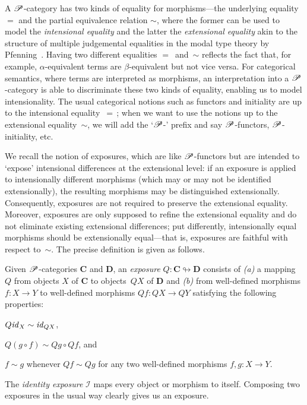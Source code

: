 \documentclass[a4paper,UKenglish,numberwithinsect,cleveref,thm-restate,draft]{lipics-v2021}
\numberwithin{equation}{section}
\theoremstyle{definition}
\theoremstyle{plain}
\begin{document}
A $\mathscr{P}$-category has two kinds of equality for morphisms---the underlying equality $=$ and the partial equivalence relation $\sim$, where the former can be used to model the \emph{intensional equality} and the latter the \emph{extensional equality} akin to the structure of multiple judgemental equalities in the modal type theory by Pfenning~\cite{Pfenning2002a}.
Having two different equalities $=$~and~$\sim$ reflects the fact that, for example, $\alpha$-equivalent terms are $\beta$-equivalent but not vice versa.
For categorical semantics, where terms are interpreted as morphisms, an interpretation into a $\mathscr{P}$-category is able to discriminate these two kinds of equality, enabling us to model intensionality.
The usual categorical notions such as functors and initiality are up to the intensional equality~$=$\,; when we want to use the notions up to the extensional equality~$\sim$, we will add the `$\mathscr{P}$-' prefix and say $\mathscr{P}$-functors, $\mathscr{P}$-initiality, etc.

We recall the notion of exposures, which are like $\mathscr{P}$-functors but are intended to `expose' intensional differences at the extensional level: if an exposure is applied to intensionally different morphisms (which may or may not be identified extensionally), the resulting morphisms may be distinguished extensionally.
Consequently, exposures are not required to preserve the extensional equality.
Moreover, exposures are only supposed to refine the extensional equality and do not eliminate existing extensional differences;
put differently, intensionally equal morphisms should be extensionally equal---that is, exposures are faithful with respect to~$\sim$.
The precise definition is given as follows.

\begin{definition}
  Given $\mathscr{P}$-categories $\mathbf{C}$ and $\mathbf{D}$, an \emph{exposure} $Q\colon \mathbf{C} \looparrowright \mathbf{D}$ consists of \emph{(a)} a mapping $Q$ from objects $X$ of\/ $\mathbf{C}$ to objects~$QX$ of\/ $\mathbf{D}$ and \emph{(b)} from well-defined morphisms $f\colon X \to Y$ to well-defined morphisms $Qf\colon QX \to QY$ satisfying the following properties:
  \begin{romanenumerate}
    \item $Q\mathit{id}_X \sim \mathit{id}_{QX}$,
    \item $Q(g \circ f) \sim Qg \circ Qf$, and
    \item $f \sim g$ whenever $Qf \sim Qg$ for any two well-defined morphisms $f, g\colon X \to Y$. 
  \end{romanenumerate}
\end{definition}
The \emph{identity exposure} $\mathcal{I}$ maps every object or morphism to itself.
Composing two exposures in the usual way clearly gives us an exposure. 
\end{document}
